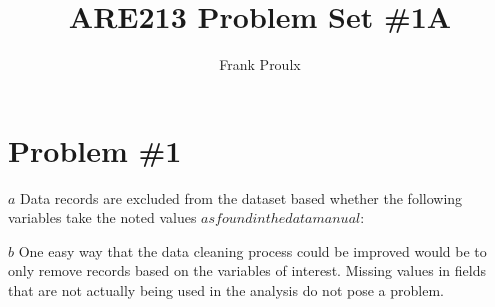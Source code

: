 \documentclass[a4paper, 12pt]{article}
\begin{document}
\title{ARE213 Problem Set \#1A}
\author{Frank Proulx}
\maketitle

\section{Problem \#1}
\(a\) Data records are excluded from the dataset based whether the following variables take the noted values \(as found in the data manual\):

\(b\) One easy way that the data cleaning process could be improved would be to only remove records based on the variables of interest. Missing values in fields that are not actually being used in the analysis do not pose a problem.
\end{document}
